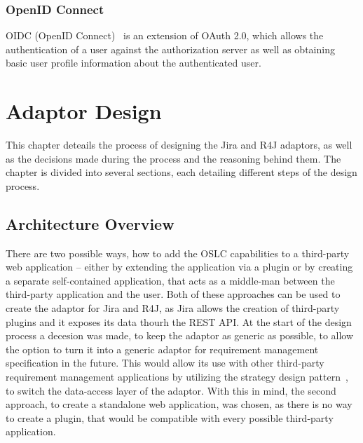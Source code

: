 \subsection*{OpenID Connect}
OIDC (OpenID Connect) \cite{oidc} is an extension of OAuth 2.0, which allows the authentication of a user against the authorization server as well as obtaining basic user profile information about the authenticated user.


\chapter{Adaptor Design}

This chapter deteails the process of designing the Jira and R4J adaptors, as well as the decisions made during the process and the reasoning behind them. The chapter is divided into several sections, each detailing different steps of the design process.

\section{Architecture Overview}
There are two possible ways, how to add the OSLC capabilities to a third-party web application -- either by extending the application via a plugin or by creating a separate self-contained application, that acts as a middle-man between the third-party application and the user. Both of these approaches can be used to create the adaptor for Jira and R4J, as Jira allows the creation of third-party plugins and it exposes its data thourh the REST API. At the start of the design process a decesion was made, to keep the adaptor as generic as possible, to allow the option to turn it into a generic adaptor for requirement management specification in the future. This would allow its use with other third-party requirement management applications by utilizing the strategy design pattern \cite{strategy_design_pattern}, to switch the data-access layer of the adaptor. With this in mind, the second approach, to create a standalone web application, was chosen, as there is no way to create a plugin, that would be compatible with every possible third-party application.

